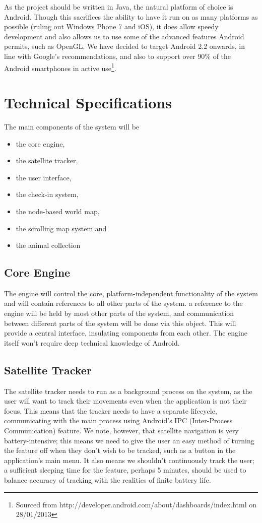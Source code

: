 \documentclass[12pt,a4paper,twoside]{article}
\begin{document}
As the project should be written in Java, the natural platform of choice is Android.
Though this sacrifices the ability to have it run on as many platforms as possible (ruling out Windows Phone 7 and iOS), it does allow speedy development and also allows us to use some of the advanced features Android permits, such as OpenGL.
We have decided to target Android 2.2 onwards, in line with Google's recommendations, and also to support over 90\% of the Android smartphones in active use\footnote{Sourced from http://developer.android.com/about/dashboards/index.html on 28/01/2013}.

\section{Technical Specifications}
The main components of the system will be
\begin{itemize}
\item the core engine,
\item the satellite tracker,
\item the user interface,
\item the check-in system,
\item the node-based world map,
\item the scrolling map system and
\item the animal collection
\end{itemize}

\subsection{Core Engine}
The engine will control the core, platform-independent functionality of the system and will contain references to all other parts of the system.
a reference to the engine will be held by most other parts of the system, and communication between different parts of the system will be done via this object.
This will provide a central interface, insulating components from each other.
The engine itself won't require deep technical knowledge of Android.

\subsection{Satellite Tracker}
The satellite tracker needs to run as a background process on the system, as the user will want to track their movements even when the application is not their focus.
This means that the tracker needs to have a separate lifecycle, communicating with the main process using Android's IPC (Inter-Process Communication) feature.
We note, however, that satellite navigation is very battery-intensive; this means we need to give the user an easy method of turning the feature off when they don't wish to be tracked, such as a button in the application's main menu.
It also means we shouldn't continuously track the user; a sufficient sleeping time for the feature, perhaps 5 minutes, should be used to balance accuracy of tracking with the realities of finite battery life.
\end{document}
